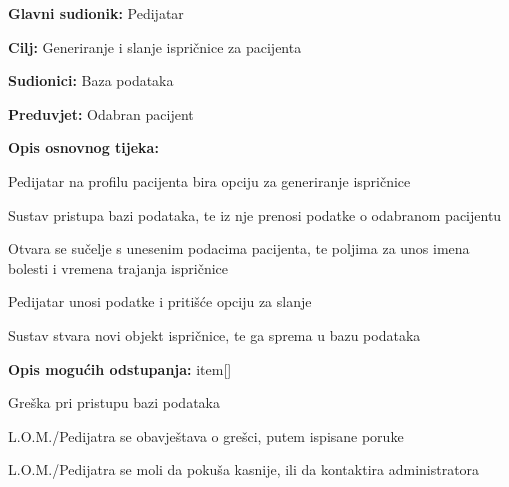 					
					\noindent {}
					\begin{packed_item}
						
						\item \textbf{Glavni sudionik: }Pedijatar
						\item  \textbf{Cilj:} Generiranje i slanje ispričnice za pacijenta
						\item  \textbf{Sudionici:} Baza podataka
						\item  \textbf{Preduvjet:} Odabran pacijent
						\item  \textbf{Opis osnovnog tijeka:}
						
						\item[] \begin{packed_enum}
							
							\item Pedijatar na profilu pacijenta bira opciju za generiranje ispričnice
							\item Sustav pristupa bazi podataka, te iz nje prenosi podatke o odabranom pacijentu
							\item Otvara se sučelje s unesenim podacima pacijenta, te poljima za unos imena bolesti i vremena trajanja ispričnice
							\item Pedijatar unosi podatke i pritišće opciju za slanje
							\item Sustav stvara novi objekt ispričnice, te ga sprema u bazu podataka
						\end{packed_enum}
						\item \textbf{Opis mogućih odstupanja:}
						item[] \begin{packed_item}
						\item[2/5.a] Greška pri pristupu bazi podataka
						\item[] \begin{packed_enum}
							
							\item L.O.M./Pedijatra se obavještava o grešci, putem ispisane poruke
							\item L.O.M./Pedijatra se moli da pokuša kasnije, ili da kontaktira administratora
							
						\end{packed_enum}
						\end{packed_item}
					\end{packed_item}
					
